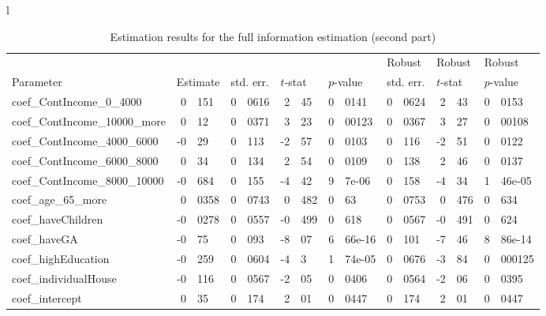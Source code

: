 \documentclass[12pt,a4paper]{article}
\begin{document}
 \begin{sidewaystable}[htb]
\caption{\label{tab:fi-2}Estimation results for the full information
  estimation (second part)}

  \begin{tabular}{l}
\begin{tabular}{lr@{.}lr@{.}lr@{.}lr@{.}lr@{.}lr@{.}lr@{.}l}
                      &   \multicolumn{2}{l}{}    & \multicolumn{2}{l}{} & \multicolumn{2}{l}{}  &     \multicolumn{2}{l}{} &   \multicolumn{2}{l}{Robust}    & \multicolumn{2}{l}{Robust}  &     \multicolumn{2}{l}{Robust}   \\
Parameter      & \multicolumn{2}{l}{Estimate}  &
\multicolumn{2}{l}{std. err.}  &  \multicolumn{2}{l}{$t$-stat}  &   \multicolumn{2}{l}{$p$-value}  &
\multicolumn{2}{l}{std. err.}  &  \multicolumn{2}{l}{$t$-stat}  &   \multicolumn{2}{l}{$p$-value}   \\
\hline
coef\_ContIncome\_0\_4000     &   0&151 &   0&0616 &    2&45 &   0&0141 &        0&0624 &         2&43 &        0&0153 \\
coef\_ContIncome\_10000\_more &    0&12 &   0&0371 &    3&23 &  0&00123 &        0&0367 &         3&27 &       0&00108 \\
coef\_ContIncome\_4000\_6000  &   -0&29 &    0&113 &   -2&57 &   0&0103 &         0&116 &        -2&51 &        0&0122 \\
coef\_ContIncome\_6000\_8000  &    0&34 &    0&134 &    2&54 &   0&0109 &         0&138 &         2&46 &        0&0137 \\
coef\_ContIncome\_8000\_10000 &  -0&684 &    0&155 &   -4&42 &  9&7e-06 &         0&158 &        -4&34 &      1&46e-05 \\
coef\_age\_65\_more           &  0&0358 &   0&0743 &   0&482 &     0&63 &        0&0753 &        0&476 &         0&634 \\
coef\_haveChildren          & -0&0278 &   0&0557 &  -0&499 &    0&618 &        0&0567 &       -0&491 &         0&624 \\
coef\_haveGA                &   -0&75 &    0&093 &   -8&07 & 6&66e-16 &         0&101 &        -7&46 &      8&86e-14 \\
coef\_highEducation         &  -0&259 &   0&0604 &    -4&3 & 1&74e-05 &        0&0676 &        -3&84 &      0&000125 \\
coef\_individualHouse       &  -0&116 &   0&0567 &   -2&05 &   0&0406 &        0&0564 &        -2&06 &        0&0395 \\
coef\_intercept             &    0&35 &    0&174 &    2&01 &   0&0447 &         0&174 &         2&01 &        0&0447 \\

\end{tabular}
\end{tabular}
\end{sidewaystable}
\end{document}
